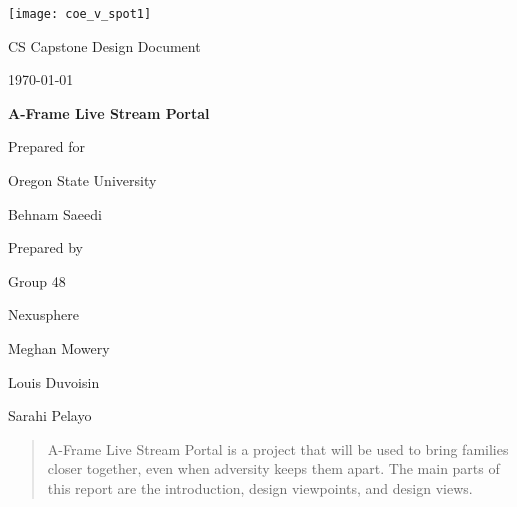 \documentclass[onecolumn, draftclsnofoot,10pt, compsoc]{IEEEtran}
\def \CapstoneTeamName{		Nexusphere}
\def \CapstoneTeamNumber{		48}
\def \GroupMemberOne{			Meghan Mowery}
\def \GroupMemberTwo{			Louis Duvoisin}
\def \GroupMemberThree{			Sarahi Pelayo}
\def \CapstoneProjectName{		A-Frame Live Stream Portal}
\def \CapstoneSponsorCompany{	Oregon State University}
\def \CapstoneSponsorPerson{		Behnam Saeedi}
\def \DocType{	%
				Design Document
				}
\newcommand{\NameSigPair}[1]{\par
\makebox[2.75in][r]{#1} \hfil 	\makebox[3.25in]{\makebox[2.25in]{\hrulefill} \hfill		\makebox[.75in]{\hrulefill}}
\par\vspace{-12pt} \textit{\tiny\noindent
\makebox[2.75in]{} \hfil		\makebox[3.25in]{\makebox[2.25in][r]{Signature} \hfill	\makebox[.75in][r]{Date}}}}
\renewcommand{\NameSigPair}[1]{#1}
\begin{document}
\begin{titlepage}
    \begin{singlespace}
    	\texttt{[image: coe\_v\_spot1]}
        \hfill 
        \par\vspace{.2in}
        \centering
        \scshape{
            \huge CS Capstone \DocType \par
            {\large\today}\par
            \vspace{.5in}
            \textbf{\Huge\CapstoneProjectName}\par
            \vfill
            {\large Prepared for}\par
            \Huge \CapstoneSponsorCompany\par
            \vspace{5pt}
            {\Large\NameSigPair{\CapstoneSponsorPerson}\par}
            {\large Prepared by }\par
            Group\CapstoneTeamNumber\par
            \CapstoneTeamName\par 
            \vspace{5pt}
            {\Large
                \NameSigPair{\GroupMemberOne}\par
                \NameSigPair{\GroupMemberTwo}\par
                \NameSigPair{\GroupMemberThree}\par
            }
            \vspace{20pt}
        }
        \begin{abstract}
        	A-Frame Live Stream Portal is a project that will be used to bring families closer together, even when adversity keeps them apart. 
        	The main parts of this report are the introduction, design viewpoints, and design views.
        \end{abstract}   	 
    \end{singlespace}
\end{titlepage}
\newpage
{}
\tableofcontents

\listoffigures
\listoftables
\clearpage
\end{document}
